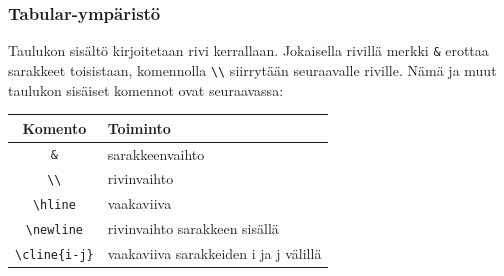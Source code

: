 \documentclass[handout,hyperref={colorlinks=true}]{beamer}
\theoremstyle{remark}
\newcommand{\vaihto}{\\ \vspace{10pt}}
\begin{document}
\begin{frame}[fragile]
    \frametitle{Tabular-ympäristö}
    Taulukon sisältö kirjoitetaan rivi kerrallaan. Jokaisella rivillä merkki \verb-&- erottaa sarakkeet toisistaan, komennolla \verb-\\- siirrytään seuraavalle riville.  Nämä ja muut taulukon sisäiset komennot ovat seuraavassa:
    \vaihto
    \begin{table}[h!]
        \begin{scriptsize}
            \begin{tabular}{cp{4cm}}
                Komento & Toiminto\\
                \hline
                \verb-&- & sarakkeenvaihto\\
                \hline
                \verb-\\- & rivinvaihto\\
                \hline
                \verb-\hline- & vaakaviiva \\
                \hline
                \verb-\newline- & rivinvaihto sarakkeen sisällä\\
                \hline
                \verb+\cline{i-j}+ & vaakaviiva sarakkeiden i ja j välillä\\
                \hline
            \end{tabular}
        \end{scriptsize}
    \end{table}

\end{frame}
\end{document}
